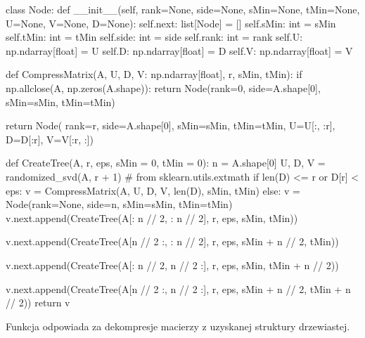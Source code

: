 \documentclass{../myclass}
\begin{document}
\begin{python}
class Node:
    def __init__(self, rank=None, side=None, sMin=None, 
                tMin=None, U=None, V=None, D=None):
        self.next: list[Node] = []
        self.sMin: int = sMin
        self.tMin: int = tMin
        self.side: int = side
        self.rank: int = rank
        self.U: np.ndarray[float] = U
        self.D: np.ndarray[float] = D
        self.V: np.ndarray[float] = V
\end{python}
\begin{python}
def CompressMatrix(A, U, D, V: np.ndarray[float], r, sMin, tMin):
    if np.allclose(A, np.zeros(A.shape)):
        return Node(rank=0, side=A.shape[0], sMin=sMin, tMin=tMin)

    return Node( rank=r, side=A.shape[0], sMin=sMin, tMin=tMin,
            U=U[:, :r], D=D[:r], V=V[:r, :])
\end{python}
\newpage
\begin{python}
def CreateTree(A, r, eps, sMin = 0, tMin = 0):
    n = A.shape[0]
    U, D, V = randomized_svd(A, r + 1) # from sklearn.utils.extmath
    if len(D) <= r or D[r] < eps:
        v = CompressMatrix(A, U, D, V, len(D), sMin, tMin)
    else:
        v = Node(rank=None, side=n, sMin=sMin, tMin=tMin)
        v.next.append(CreateTree(A[: n // 2, : n // 2], 
                        r, eps, sMin, tMin))

        v.next.append(CreateTree(A[n // 2 :, : n // 2], 
                        r, eps, sMin + n // 2, tMin))

        v.next.append(CreateTree(A[: n // 2, n // 2 :], 
                        r, eps, sMin, tMin + n // 2))

        v.next.append(CreateTree(A[n // 2 :, n // 2 :], 
                        r, eps, sMin + n // 2, tMin + n // 2))
    return v
\end{python}

Funkcja  odpowiada za dekompresje macierzy z uzyskanej struktury
drzewiastej.
\end{document}
